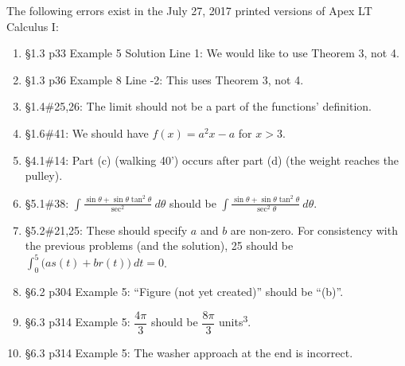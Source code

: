 \documentclass{amsart}
\newcommand{\ds}{\displaystyle}
\begin{document}
The following errors exist in the July 27, 2017 printed versions of Apex LT Calculus I:
\begin{enumerate}
\item \S1.3 p33 Example 5 Solution Line 1: We would like to use Theorem 3, not 4.
\item \S1.3 p36 Example 8 Line -2: This uses Theorem 3, not 4.
\item \S1.4\#25,26: The limit should not be a part of the functions' definition.
\item \S1.6\#41: We should have $f(x)=a^2x-a$ for $x>3$.
\item \S4.1\#14: Part (c) (walking 40') occurs after part (d) (the weight reaches the pulley).
\item \S5.1\#38: $\ds \int \frac{\sin\theta+\sin\theta\tan^2\theta}{\sec^2}\ d\theta$ should be $\ds \int \frac{\sin\theta+\sin\theta\tan^2\theta}{\sec^2\theta}\ d\theta$.
\item \S5.2\#21,25: These should specify $a$ and $b$ are non-zero.  For consistency with the previous problems (and the solution), 25 should be $\ds\int_0^5 \big(as(t)+br(t)\big) \ dt=0$.
\item \S6.2 p304 Example 5: ``Figure (not yet created)'' should be ``(b)''.
\item \S6.3 p314 Example 5: $\dfrac{4\pi}3$ should be $\dfrac{8\pi}3$ units\textsuperscript3.
\item \S6.3 p314 Example 5: The washer approach at the end is incorrect.
\label{2017-07-27Iplus}
\end{enumerate}

\end{document}
